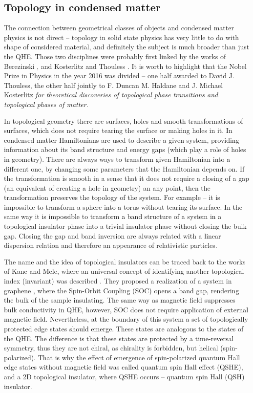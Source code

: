 \documentclass[titlepage,a4paper]{book}
\newcommand{\wciecie}{\quad\phantom{v}}
\begin{document}
\subsection{Topology in condensed matter}
\wciecie
The connection between geometrical classes of objects and condensed matter physics is not direct -- topology in solid state physics has very little to do with shape of considered material, and definitely the subject is much broader than just the QHE. Those two disciplines were probably first linked by the works of Berezinski \cite{Berezinski1}\cite{Berezinski2}, and Kosterlitz and Thouless \cite{Thouless_nobel}. It is worth to highlight that the Nobel Prize in Physics in the year 2016 was divided -- one half awarded to David J. Thouless, the other half jointly to F. Duncan M. Haldane and J. Michael Kosterlitz \textit{for theoretical discoveries of topological phase transitions and topological phases of matter}.

In topological geometry there are surfaces, holes and smooth transformations of surfaces, which does not require tearing the surface or making holes in it. In condensed matter Hamiltonians are used to describe a given system, providing information about its band structure and energy gaps (which play a role of holes in geometry). There are always ways to transform given Hamiltonian into a different one, by changing some parameters that the Hamiltonian depends on. If the transformation is smooth in a sense that it does not require a closing of a gap (an equivalent of creating a hole in geometry) an any point, then the transformation preserves the topology of the system. For example -- it is impossible to transform a sphere into a torus without tearing its surface. In the same way it is impossible to transform a band structure of a system in a topological insulator phase into a trivial insulator phase without closing the bulk gap. Closing the gap and band inversion are always related with a linear dispersion relation and therefore an appearance of relativistic particles. 

The name and the idea of topological insulators can be traced back to the works of Kane and Mele, where an universal concept of identifying another topological index (invariant) was described \cite{Kane_Topology2}. They proposed a realization of a system in graphene \cite{Kane_Topology}, where the Spin-Orbit Coupling (SOC) opens a band gap, rendering the bulk of the sample insulating. The same way as magnetic field suppresses bulk conductivity in QHE, however, SOC does not require application of external magnetic field. Nevertheless, at the boundary of this system a set of topologically protected edge states should emerge. These states are analogous to the states of the QHE. The difference is that these states are protected by a time-reversal symmetry, thus they are not chiral, as chirality is forbidden, but helical (spin-polarized). That is why the effect of emergence of spin-polarized quantum Hall edge states without magnetic field was called quantum spin Hall effect (QSHE), and a 2D topological insulator, where QSHE occurs -- quantum spin Hall (QSH) insulator.
\end{document}
